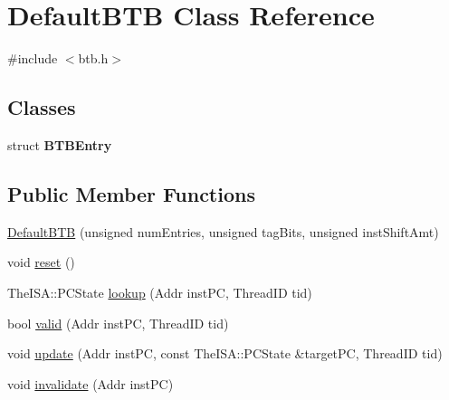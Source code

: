\hypertarget{classDefaultBTB}{
\section{DefaultBTB Class Reference}
\label{classDefaultBTB}
}


{\ttfamily \#include $<$btb.h$>$}

\subsection*{Classes}
\begin{DoxyCompactItemize}
\item 
struct {\bfseries BTBEntry}
\end{DoxyCompactItemize}
\subsection*{Public Member Functions}
\begin{DoxyCompactItemize}
\item 
\hyperlink{classDefaultBTB_af3c58b594bc54e0b1f416d11c482bd60}{DefaultBTB} (unsigned numEntries, unsigned tagBits, unsigned instShiftAmt)
\item 
void \hyperlink{classDefaultBTB_a079bd92b539fb38fb658665a08b65974}{reset} ()
\item 
TheISA::PCState \hyperlink{classDefaultBTB_ad21521b111945ccf058a3687ef720339}{lookup} (Addr instPC, ThreadID tid)
\item 
bool \hyperlink{classDefaultBTB_aaa68fd09a8bfbce33ad7be0d5b872953}{valid} (Addr instPC, ThreadID tid)
\item 
void \hyperlink{classDefaultBTB_a554c0af23b92df168310e4edaf627c51}{update} (Addr instPC, const TheISA::PCState \&targetPC, ThreadID tid)
\item 
void \hyperlink{classDefaultBTB_a113bbc10686e3620f0f43ad1f5ba21b0}{invalidate} (Addr instPC)
\end{DoxyCompactItemize}


